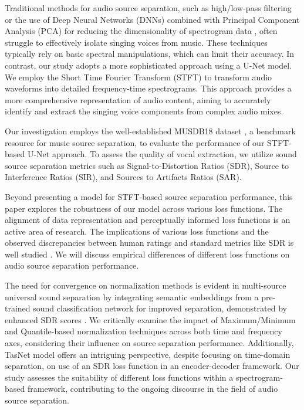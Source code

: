 \documentclass[conference]{IEEEtran}
\begin{document}
Traditional methods for audio source separation, such as high/low-pass filtering or the use of Deep Neural Networks (DNNs) combined with Principal Component Analysis (PCA) for reducing the dimensionality of spectrogram data \cite{nugraha2016multichannel}, often struggle to effectively isolate singing voices from music. These techniques typically rely on basic spectral manipulations, which can limit their accuracy. In contrast, our study adopts a more sophisticated approach using a U-Net model. We employ the Short Time Fourier Transform (STFT) to transform audio waveforms into detailed frequency-time spectrograms. This approach provides a more comprehensive representation of audio content, aiming to accurately identify and extract the singing voice components from complex audio mixes.

Our investigation employs the well-established MUSDB18 dataset \cite{musdb18}, a benchmark resource for music source separation, to evaluate the performance of our STFT-based U-Net approach. To assess the quality of vocal extraction, we utilize sound source separation metrics such as Signal-to-Distortion Ratios (SDR), Source to Interference Ratios (SIR), and Sources to Artifacts Ratios (SAR). 

Beyond presenting a model for STFT-based source separation performance, this paper explores the robustness of our model across various loss functions. The alignment of data representation and perceptually informed loss functions is an active area of research. The implications of various loss functions and the observed discrepancies between human ratings and standard metrics like SDR is well studied \cite{guso2022loss}. We will discuss empirical differences of different loss functions on audio source separation performance.

The need for convergence on normalization methods is evident in multi-source universal sound separation by integrating semantic embeddings from a pre-trained sound classification network for improved separation, demonstrated by enhanced SDR scores \cite{tzinis2020improving}. We critically examine the impact of Maximum/Minimum and Quantile-based normalization techniques across both time and frequency axes, considering their influence on source separation performance. Additionally, TasNet model \cite{luo2018tasnet} offers an intriguing perspective, despite focusing on time-domain separation, on use of an SDR loss function in an encoder-decoder framework. Our study assesses the suitability of different loss functions within a spectrogram-based framework, contributing to the ongoing discourse in the field of audio source separation.
\end{document}
